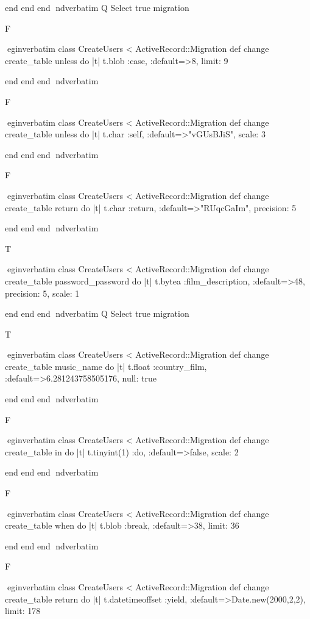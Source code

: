     end 
  end 
end
nd{verbatim}
Q
 Select true migration

F

egin{verbatim}
 class CreateUsers < ActiveRecord::Migration 
  def change 
    create_table unless do |t| 
      t.blob :case, :default=>8, limit: 9
    
    end 
  end 
end
nd{verbatim}

F

egin{verbatim}
 class CreateUsers < ActiveRecord::Migration 
  def change 
    create_table unless do |t| 
      t.char :self, :default=>"vGUsBJiS", scale: 3
    
    end 
  end 
end
nd{verbatim}

F

egin{verbatim}
 class CreateUsers < ActiveRecord::Migration 
  def change 
    create_table return do |t| 
      t.char :return, :default=>"RUqcGaIm", precision: 5
    
    end 
  end 
end
nd{verbatim}

T

egin{verbatim}
 class CreateUsers < ActiveRecord::Migration 
  def change 
    create_table password_password do |t| 
      t.bytea :film_description, :default=>48, precision: 5, scale: 1
    
    end 
  end 
end
nd{verbatim}
Q
 Select true migration

T

egin{verbatim}
 class CreateUsers < ActiveRecord::Migration 
  def change 
    create_table music_name do |t| 
      t.float :country_film, :default=>6.281243758505176, null: true
    
    end 
  end 
end
nd{verbatim}

F

egin{verbatim}
 class CreateUsers < ActiveRecord::Migration 
  def change 
    create_table in do |t| 
      t.tinyint(1) :do, :default=>false, scale: 2
    
    end 
  end 
end
nd{verbatim}

F

egin{verbatim}
 class CreateUsers < ActiveRecord::Migration 
  def change 
    create_table when do |t| 
      t.blob :break, :default=>38, limit: 36
    
    end 
  end 
end
nd{verbatim}

F

egin{verbatim}
 class CreateUsers < ActiveRecord::Migration 
  def change 
    create_table return do |t| 
      t.datetimeoffset :yield, :default=>Date.new(2000,2,2), limit: 178
    
